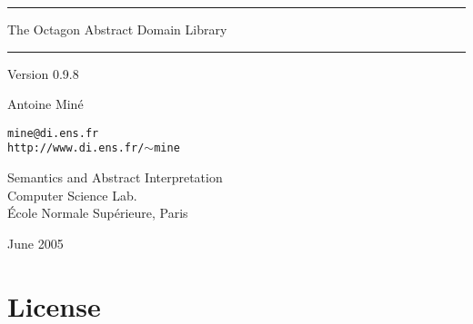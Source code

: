 \documentclass[twosides]{report}
\newcommand{\ver}{0.9.8}
\begin{document}
           

\sloppy


\thispagestyle{empty}

\vspace*{3cm}

\begin{center}
\rule{\linewidth}{1mm}
\vspace*{-0.2mm}\par
\textsf{\Huge The Octagon Abstract Domain Library}\par
\vspace*{0.8mm}
\rule{\linewidth}{1mm}
\end{center}
\vspace*{0.5cm}
\begin{center}\Large Version \ver\end{center}
\vspace*{3cm}
\begin{center}\LARGE\sc Antoine Min\'e\end{center}
\begin{center}\large\tt mine@di.ens.fr\\
http://www.di.ens.fr/$\sim$mine\end{center}
\vspace*{0.1cm}
\begin{center}\Large 
Semantics and Abstract Interpretation\\
Computer Science Lab.\\
\'Ecole Normale Sup\'erieure, Paris
\end{center}
\vspace*{2cm}\begin{center}\Large June 2005\end{center}



\cleardoublepage
\tableofcontents

\cleardoublepage
\chapter*{License}
\end{document}
